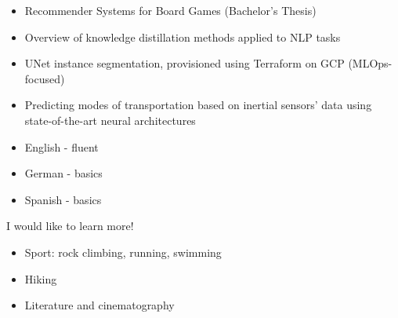 \vspace{3mm}
\begin{itemize}
    \item{\textcolor{emphasis}{Recommender Systems for Board Games}  (Bachelor's Thesis)}
    \item{\textcolor{emphasis}{Overview of knowledge distillation methods applied to NLP tasks}}  
    \item{\textcolor{emphasis}{UNet instance segmentation, provisioned using Terraform on GCP} (MLOps-focused)}      \
    \item{\textcolor{emphasis}{Predicting modes of transportation based on inertial sensors' data using state-of-the-art neural architectures}}
\end{itemize}

 \vspace{3mm}

\vspace{4mm}
\begin{itemize}
\item{\textcolor{emphasis}{English} - fluent}

\item{\textcolor{emphasis}{German} - basics}

\item{\textcolor{emphasis}{Spanish} - basics}
\end{itemize}
\medskip
I would like to learn more!

\vspace{4mm}
\begin{itemize}
\item Sport: rock climbing, running, swimming
\item Hiking
\item Literature and cinematography
\end{itemize}

\medskip
